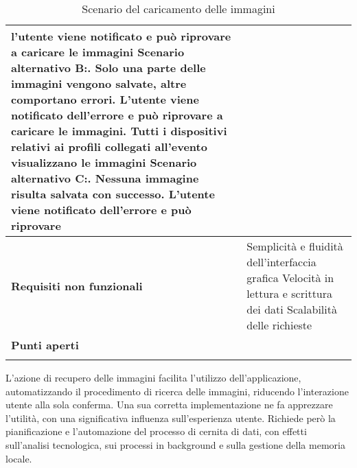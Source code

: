 \begin{longtable} {|P{4.5cm}|P{11cm}|}
        l'utente viene notificato e può riprovare a caricare le immagini\newline
        Scenario alternativo B:. Solo una parte delle immagini vengono salvate, altre comportano errori. L'utente viene notificato dell'errore e può riprovare a caricare le immagini. Tutti i dispositivi relativi ai profili collegati all'evento visualizzano le immagini\newline
        Scenario alternativo C:. Nessuna immagine risulta salvata con successo. L'utente viene notificato dell'errore e può riprovare                                                            \\
        \hline
        \textbf{Requisiti non funzionali} & Semplicità e fluidità dell'interfaccia grafica   \newline
        Velocità in lettura e scrittura dei dati\newline
        Scalabilità delle richieste                                                                                         \\
        \hline
        \textbf{Punti aperti}             &                                                                                 \\
        \hline

    \caption{Scenario del caricamento delle immagini}
\end{longtable}

L'azione di recupero delle immagini facilita l'utilizzo dell'applicazione,
automatizzando il procedimento di ricerca delle immagini,
riducendo l'interazione utente alla sola conferma.
Una sua corretta implementazione ne fa apprezzare l'utilità, 
con una significativa influenza sull'esperienza utente.
Richiede però la pianificazione e l'automazione del processo di cernita di dati,
con effetti sull'analisi tecnologica, sui processi in background e sulla gestione della memoria locale.\\

